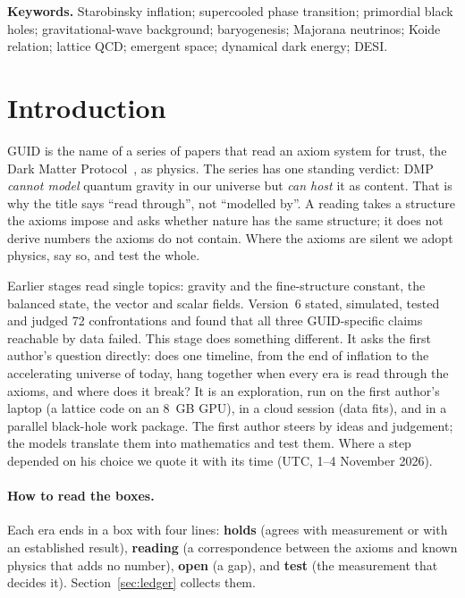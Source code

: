 \documentclass[11pt,a4paper]{article}
\begin{document}
\noindent\textbf{Keywords.} Starobinsky inflation; supercooled phase transition; primordial black holes; gravitational-wave background;
baryogenesis; Majorana neutrinos; Koide relation; lattice QCD; emergent space; dynamical dark energy; DESI.

\tableofcontents
\bigskip

\section{Introduction}\label{sec:intro}

GUID is the name of a series of papers that read an axiom system for trust, the Dark Matter Protocol~\cite{dmp}, as physics. The series
has one standing verdict: DMP \emph{cannot model} quantum gravity in our universe but \emph{can host} it as content. That is why the title says
``read through'', not ``modelled by''. A reading takes a structure the axioms impose and asks whether nature has the same structure; it
does not derive numbers the axioms do not contain. Where the axioms are silent we adopt physics, say so, and test the whole.

Earlier stages read single topics: gravity and the fine-structure constant, the balanced state, the vector and scalar fields. Version~6
stated, simulated, tested and judged 72 confrontations and found that all three GUID-specific claims reachable by data failed. This stage
does something different. It asks the first author's question directly: does one timeline, from the end of inflation to the accelerating
universe of today, hang together when every era is read through the axioms, and where does it break? It is an exploration, run on the
first author's laptop (a lattice code on an 8~GB GPU), in a cloud session (data fits), and in a parallel black-hole work package. The
first author steers by ideas and judgement; the models translate them into mathematics and test them. Where a step depended on his choice we
quote it with its time (UTC, 1--4 November 2026).

\paragraph{How to read the boxes.} Each era ends in a box with four lines: \textbf{holds} (agrees with measurement or with an established
result), \textbf{reading} (a correspondence between the axioms and known physics that adds no number), \textbf{open} (a gap), and
\textbf{test} (the measurement that decides it). Section~\ref{sec:ledger} collects them.
\end{document}
